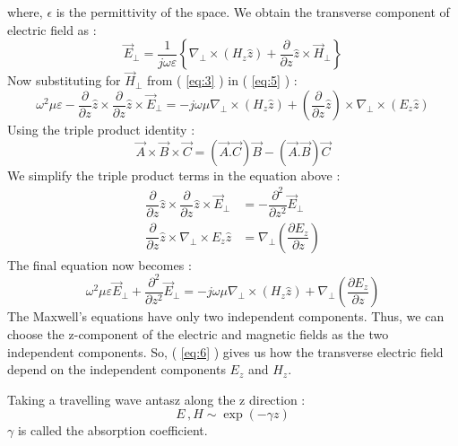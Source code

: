 \documentclass[12pt]{article}
\newcommand*{\myref}[1]{%
  \begingroup
    \hypersetup{
      linkcolor=linkequation,
      linkbordercolor=linkequation,
    }%
    \ref{#1}%
  \endgroup
}
\begin{document}
where, $\epsilon$ is the permittivity of the space. \linebreak
We obtain the transverse component of electric field as :
\begin{equation}
  \vec{E}_{\perp} = \dfrac{1}{j\omega \varepsilon} \left\{ \nabla_{\perp}\times \left( H_z \hat{z} \right)+\dfrac{\partial}{\partial z}\hat{z}\times \vec{H}_{\perp} \right\} \label{eq:5}
\end{equation}
Now substituting for $\vec{H}_{\perp}$ from (\myref{eq:3}) in (\myref{eq:5}) :
\begin{equation*}
  \omega^2 \mu \varepsilon - \dfrac{\partial}{\partial z} \hat{z}\times \dfrac{\partial}{\partial z} \hat{z} \times \vec{E}_{\perp} = -j\omega \mu \nabla_{\perp} \times \left( H_z \hat{z} \right)+\left( \dfrac{\partial}{\partial z}\hat{z} \right) \times \nabla_{\perp} \times \left( E_z \hat{z} \right)
\end{equation*}
Using the triple product identity :
\begin{equation*}
  \vec{A}\times \vec{B}\times \vec{C}=\left( \vec{A}.\vec{C} \right)\vec{B}-\left( \vec{A}.\vec{B} \right)\vec{C}
\end{equation*}
We simplify the triple product terms in the equation above :
\begin{align*}
  \dfrac{\partial}{\partial z}\hat{z}\times \dfrac{\partial}{\partial z} \hat{z} \times \vec{E}_{\perp} &= - \dfrac{\partial^2}{\partial z^2}\vec{E}_{\perp} \\
  \dfrac{\partial}{\partial z}\hat{z}\times \nabla_{\perp}\times E_z \hat{z} &= \nabla_{\perp} \left( \dfrac{\partial E_z}{\partial z} \right)
\end{align*}
The final equation now becomes :
\begin{equation}
  \omega^2 \mu \varepsilon \vec{E}_{\perp} +\dfrac{\partial^2}{\partial z^2}\vec{E}_{\perp} = -j\omega \mu \nabla_{\perp}\times \left( H_z \hat{z} \right)+\nabla_{\perp} \left( \dfrac{\partial E_z}{\partial z} \right) \label{eq:6}
\end{equation}
The Maxwell's equations have only two independent components. Thus, we can choose the z-component of the electric and magnetic fields as the two independent components. So, (\myref{eq:6}) gives us how the transverse electric field depend on the independent components $E_z$ and $H_z$. \linebreak

Taking a travelling wave antasz along the z direction :
\begin{equation}
  E\, , H \sim \exp(-\gamma z) \label{eq:7}
\end{equation}
$\gamma$ is called the absorption coefficient. \linebreak
\end{document}
